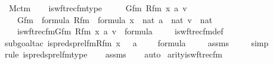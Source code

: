 \begin{isabellebody}
\isanewline
{}\isamarkupfalse%
\ M{\isacharunderscore}{\kern0pt}ctm\ \isanewline
{}\ \isanewline
\isanewline
{}\isamarkupfalse%
\ is{\isacharunderscore}{\kern0pt}wftrec{\isacharunderscore}{\kern0pt}fm{\isacharunderscore}{\kern0pt}type\ {\isacharcolon}{\kern0pt}\ \isanewline
\ \ \ Gfm\ Rfm\ x\ a\ v\ \isanewline
\ \ \ {\isachardoublequoteopen}Gfm\ {\isasymin}\ formula{\isachardoublequoteclose}\ {\isachardoublequoteopen}Rfm\ {\isasymin}\ formula{\isachardoublequoteclose}\ {\isachardoublequoteopen}x\ {\isasymin}\ nat{\isachardoublequoteclose}\ {\isachardoublequoteopen}a\ {\isasymin}\ nat{\isachardoublequoteclose}\ {\isachardoublequoteopen}v\ {\isasymin}\ nat{\isachardoublequoteclose}\ \isanewline
\ \ \ {\isachardoublequoteopen}is{\isacharunderscore}{\kern0pt}wftrec{\isacharunderscore}{\kern0pt}fm{\isacharparenleft}{\kern0pt}Gfm{\isacharcomma}{\kern0pt}\ Rfm{\isacharcomma}{\kern0pt}\ x{\isacharcomma}{\kern0pt}\ a{\isacharcomma}{\kern0pt}\ v{\isacharparenright}{\kern0pt}\ {\isasymin}\ formula{\isachardoublequoteclose}\ \isanewline
%
\isadelimproof
\isanewline
\ \ %
\endisadelimproof
%
\isatagproof
{}\isamarkupfalse%
\ is{\isacharunderscore}{\kern0pt}wftrec{\isacharunderscore}{\kern0pt}fm{\isacharunderscore}{\kern0pt}def\ \isanewline
\ \ \isamarkupfalse%
{\isacharparenleft}{\kern0pt}subgoal{\isacharunderscore}{\kern0pt}tac\ {\isachardoublequoteopen}is{\isacharunderscore}{\kern0pt}preds{\isacharunderscore}{\kern0pt}prel{\isacharunderscore}{\kern0pt}fm{\isacharparenleft}{\kern0pt}Rfm{\isacharcomma}{\kern0pt}\ x\ {\isacharhash}{\kern0pt}{\isacharplus}{\kern0pt}\ {}{\isacharcomma}{\kern0pt}\ a\ {\isacharhash}{\kern0pt}{\isacharplus}{\kern0pt}\ {}{\isacharcomma}{\kern0pt}\ {}{\isacharparenright}{\kern0pt}\ {\isasymin}\ formula{\isachardoublequoteclose}{\isacharparenright}{\kern0pt}\ \isanewline
\ \ \isamarkupfalse%
\ assms\isanewline
\ \ \ \isamarkupfalse%
\ simp\isanewline
\ \ \isamarkupfalse%
{\isacharparenleft}{\kern0pt}rule\ is{\isacharunderscore}{\kern0pt}preds{\isacharunderscore}{\kern0pt}prel{\isacharunderscore}{\kern0pt}fm{\isacharunderscore}{\kern0pt}type{\isacharparenright}{\kern0pt}\isanewline
\ \ \isamarkupfalse%
\ assms\isanewline
\ \ \isamarkupfalse%
\ auto%
\endisatagproof
{\isafoldproof}%
%
\isadelimproof
\isanewline
%
\endisadelimproof
\isanewline
{}\isamarkupfalse%
\ arity{\isacharunderscore}{\kern0pt}is{\isacharunderscore}{\kern0pt}wftrec{\isacharunderscore}{\kern0pt}fm\ {\isacharcolon}{\kern0pt}\ \isanewline

\end{isabellebody}

